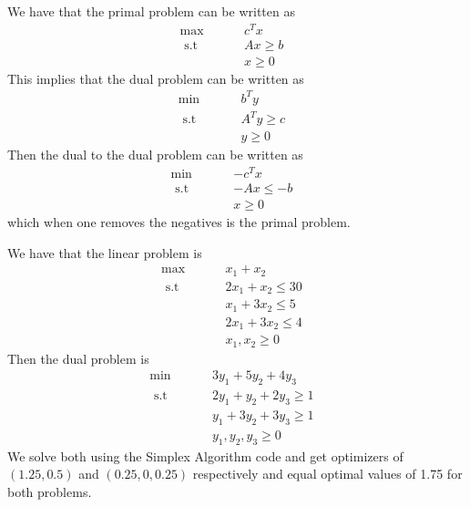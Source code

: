 \documentclass[12pt]{article}
\newenvironment{problem}[2][Problem]{\begin{trivlist}
\item[\hskip \labelsep {\bfseries #1}\hskip \labelsep {\bfseries #2}]}{\end{trivlist}}
\begin{document}
\begin{problem}{8.17.} 
We have that the primal problem can be written as
\begin{align*}
\max \hspace{1cm} & c^Tx &\\
 \text{ s.t } \hspace{1cm}  & Ax \geq b& \\
 & x \geq 0&
\end{align*}
This implies that the dual problem can be written as
\begin{align*}
\min \hspace{1cm} & b^Ty &\\
 \text{ s.t } \hspace{1cm}  & A^Ty \geq c&\\
 & y \geq 0& 
\end{align*}
Then the dual to the dual problem can be written as
\begin{align*}
\min \hspace{1cm} & -c^Tx &\\
 \text{ s.t } \hspace{1cm}  & -Ax \leq -b &\\
 &x \geq 0& 
\end{align*}
which when one removes the negatives is the primal problem.
\end{problem}

\begin{problem}{8.18.} 
We have that the linear problem is
\begin{align*}
\max \hspace{1cm} & x_1 +x_2 &\\
 \text{ s.t } \hspace{1cm}  & 2x_1 + x_2 \leq 3 0& \\
 &x_1 + 3x_2 \leq 5 &\\
 &2x_1 + 3x_2 \leq 4 &\\
 &x_1, x_2 \geq 0
\end{align*}
Then the dual problem is
\begin{align*}
\min \hspace{1cm} & 3y_1 + 5y_2 + 4y_3 &\\
 \text{ s.t } \hspace{1cm}  &  2y_1+y_2+2y_3 \geq 1& \\
 & y_1+3y_2+3y_3 \geq 1& \\
  & y_1,y_2,y_3 \geq 0&
\end{align*}
We solve both using the Simplex Algorithm code and get optimizers of $(1.25, 0.5)$ and $(0.25, 0, 0.25)$ respectively and equal optimal values of 1.75 for both problems. 
\end{problem}
\end{document}
